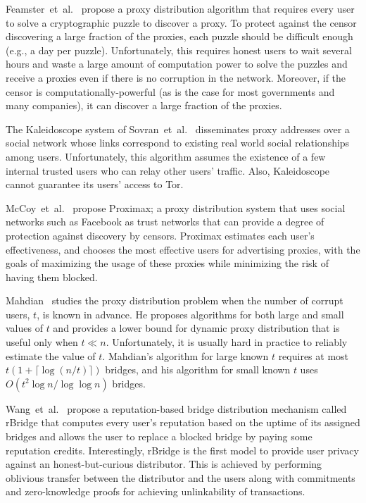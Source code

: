 \documentclass[a4paper,UKenglish]{lipics-v2016}
\newcommand{\etal}{et~al.}
\newcommand{\eg}{e.g.}
\begin{document}
Feamster~\etal~\cite{Feamster:PETS:2003} propose a proxy distribution algorithm that requires every user to solve a cryptographic puzzle to discover a proxy. To protect against the censor discovering a large fraction of the proxies, each puzzle should be difficult enough (\eg, a day per puzzle). Unfortunately, this requires honest users to wait several hours and waste a large amount of computation power to solve the puzzles and receive a proxies even if there is no corruption in the network. Moreover, if the censor is computationally-powerful (as is the case for most governments and many companies), it can discover a large fraction of the proxies.

The Kaleidoscope system of Sovran~\etal~\cite{Sovran:2008:PSN} disseminates proxy addresses over a social network whose links correspond to existing real world social relationships among users. Unfortunately, this algorithm assumes the existence of a few internal trusted users who can relay other users' traffic. Also, Kaleidoscope cannot guarantee its users' access to Tor.

McCoy~\etal~\cite{McCoy:FC:2011} propose Proximax; a proxy distribution system that uses social networks such as Facebook as trust networks that can provide a degree of protection against discovery by censors. Proximax estimates each user's effectiveness, and chooses the most effective users for advertising proxies, with the goals of maximizing the usage of these proxies while minimizing the risk of having them blocked.

Mahdian~\cite{Mahdian:2010} studies the proxy distribution problem when the number of corrupt users, $t$, is known in advance. He proposes algorithms for both large and small values of $t$ and provides a lower bound for dynamic proxy distribution that is useful only when ${t \ll n}$.
Unfortunately, it is usually hard in practice to reliably estimate the value of $t$. Mahdian's algorithm for large known $t$ requires at most ${t\left(1 + \lceil \log{(n/t)} \rceil \right)}$ bridges, and his algorithm for small known $t$ uses ${O(t^2 \log{n} / \log{\log{n}})}$ bridges.

Wang~\etal~\cite{WangLBH:rBridge:13} propose a reputation-based bridge distribution mechanism called rBridge that computes every user's reputation based on the uptime of its assigned bridges and allows the user to replace a blocked bridge by paying some reputation credits. Interestingly, rBridge is the first model to provide user privacy against an honest-but-curious distributor. This is achieved by performing oblivious transfer between the distributor and the users along with commitments and zero-knowledge proofs for achieving unlinkability of transactions.
\end{document}
